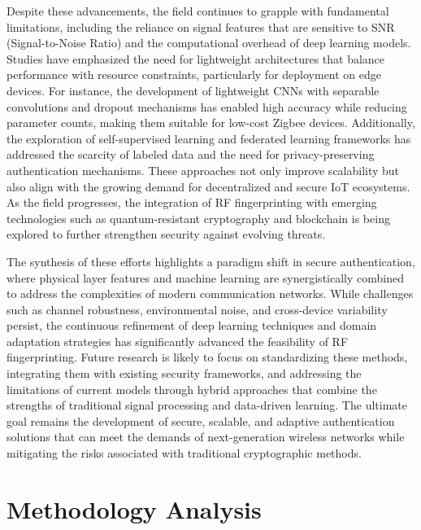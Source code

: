 \documentclass[conference]{IEEEtran}
\begin{document}
Despite these advancements, the field continues to grapple with fundamental limitations, including the reliance on signal features that are sensitive to SNR (Signal-to-Noise Ratio) and the computational overhead of deep learning models. Studies have emphasized the need for lightweight architectures that balance performance with resource constraints, particularly for deployment on edge devices. For instance, the development of lightweight CNNs with separable convolutions and dropout mechanisms has enabled high accuracy while reducing parameter counts, making them suitable for low-cost Zigbee devices. Additionally, the exploration of self-supervised learning and federated learning frameworks has addressed the scarcity of labeled data and the need for privacy-preserving authentication mechanisms. These approaches not only improve scalability but also align with the growing demand for decentralized and secure IoT ecosystems. As the field progresses, the integration of RF fingerprinting with emerging technologies such as quantum-resistant cryptography and blockchain is being explored to further strengthen security against evolving threats.  

The synthesis of these efforts highlights a paradigm shift in secure authentication, where physical layer features and machine learning are synergistically combined to address the complexities of modern communication networks. While challenges such as channel robustness, environmental noise, and cross-device variability persist, the continuous refinement of deep learning techniques and domain adaptation strategies has significantly advanced the feasibility of RF fingerprinting. Future research is likely to focus on standardizing these methods, integrating them with existing security frameworks, and addressing the limitations of current models through hybrid approaches that combine the strengths of traditional signal processing and data-driven learning. The ultimate goal remains the development of secure, scalable, and adaptive authentication solutions that can meet the demands of next-generation wireless networks while mitigating the risks associated with traditional cryptographic methods.

\section{Methodology Analysis}
\end{document}
